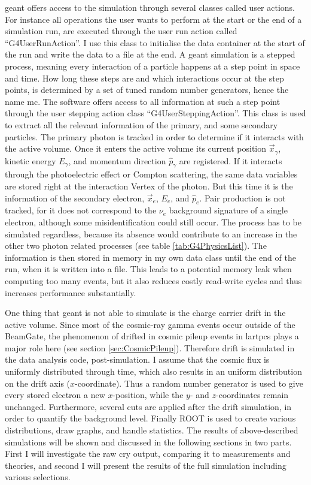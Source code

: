 \Gls{geant} offers access to the simulation through several classes called user actions. For instance all operations the user wants to perform at the start or the end of a simulation run, are executed through the user run action called ``G4UserRunAction''. I use this class to initialise the data container at the start of the run and write the data to a file at the end. A \gls{geant} simulation is a stepped process, meaning every interaction of a particle happens at a step point in space and time. How long these steps are and which interactions occur at the step points, is determined by a set of tuned random number generators, hence the name \acrfull{mc}. The software offers access to all information at such a step point through the user stepping action class ``G4UserSteppingAction''. This class is used to extract all the relevant information of the primary, and some secondary particles. The primary photon is tracked in order to determine if it interacts with the active volume. Once it enters the active volume its current position $\vec{x}_\gamma$, kinetic energy $E_\gamma$, and momentum direction $\hat{p}_\gamma$ are registered. If it interacts through the photoelectric effect or Compton scattering, the same data variables are stored right at the interaction \gls{Vertex} of the photon. But this time it is the information of the secondary electron, \ie $\vec{x}_e$, $E_e$, and $\hat{p}_e$. Pair production is not tracked, for it does not correspond to the $\nu_e$ background signature of a single electron, although some misidentification could still occur. The process has to be simulated regardless, because its absence would contribute to an increase in the other two photon related processes (see table \ref{tab:G4PhysicsList}). The information is then stored in memory in my own data class until the end of the run, when it is written into a file. This leads to a potential memory leak when computing too many events, but it also reduces costly read-write cycles and thus increases performance substantially.

One thing that \gls{geant} is not able to simulate is the charge carrier drift in the active volume. Since most of the cosmic-ray gamma events occur outside of the \gls{BeamGate}, the phenomenon of drifted in cosmic pileup events in \glspl{lartpc} plays a major role here (see section \ref{sec:CosmicPileup}). Therefore drift is simulated in the data analysis code, \ie post-simulation. I assume that the cosmic flux is uniformly distributed through time, which also results in an uniform distribution on the drift axis ($x$-coordinate). Thus a random number generator is used to give every stored electron a new $x$-position, while the $y$- and $z$-coordinates remain unchanged. Furthermore, several cuts are applied after the drift simulation, in order to quantify the background level. Finally ROOT is used to create various distributions, draw graphs, and handle statistics. The results of above-described simulations will be shown and discussed in the following sections in two parts. First I will investigate the raw \gls{cry} output, comparing it to measurements and theories, and second I will present the results of the full simulation including various selections.

